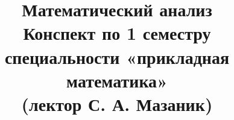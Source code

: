 \begin{titlepage}
	\clearpage\thispagestyle{empty}
\title{\textbf{\Huge{Математический анализ}}\\Конспект по 1 семестру 
	специальности «прикладная математика»\\(лектор С. А. Мазаник)} %
	
	\date{}
	\pagebreak
\end{titlepage}